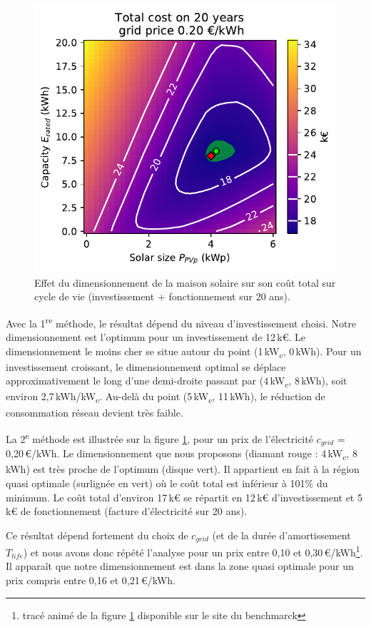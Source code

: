\documentclass[a4paper,10pt,twocolumn]{article}
\newcommand\tsp[1]{\textsuperscript{#1}}
\newcommand\sub[1]{\textsubscript{#1}}
\newcommand\kWc{kW\sub{c}{}} %
\begin{document}
\begin{figure}[!ht]
  \begin{center}
	  \includegraphics[width=0.8\columnwidth]{figures/Total_cost_map_grid020.pdf}
  \end{center}

  \caption{Effet du dimensionnement de la maison solaire sur son coût total sur cycle de vie
  (investissement + fonctionnement sur 20 ans).
  }
  \label{fig:cost_tot}
\end{figure}

Avec la 1\tsp{re} méthode, le résultat dépend du niveau d'investissement choisi.
Notre dimensionnement est l'optimum pour un investissement de 12\,k€.
Le dimensionnement le moins cher se situe autour du point
(1\,\kWc, 0\,kWh). Pour un investissement croissant,
le dimensionnement optimal se déplace approximativement le long
d'une demi-droite passant par (4\,\kWc, 8\,kWh), soit environ
2,7\,kWh/\kWc.
Au-delà du point (5\,\kWc, 11\,kWh), le réduction de consommation réseau devient très faible.

La 2\tsp{e} méthode est illustrée sur la figure \ref{fig:cost_tot},
pour un prix de l'électricité $c_{grid}$ = 0,20\,€/kWh.
Le dimensionnement que nous proposons (diamant rouge : 4\,kW\sub{c}, 8\,kWh)
est très proche de l'optimum (disque vert).
Il appartient en fait à la région quasi optimale (surlignée en vert)
où le coût total est inférieur à 101\% du minimum.
Le coût total d'environ 17\,k€ se répartit en 12\,k€ d'investissement
et 5\,k€ de fonctionnement (facture d'électricité sur 20 ans).

Ce résultat dépend fortement du choix de $c_{grid}$
(et de la durée d'amortissement $T_{life}$)
et nous avons donc répété l'analyse pour un prix entre 0,10 et 0,30\,€/kWh\footnote{%
  tracé animé de la figure \ref{fig:cost_tot} disponible sur le site du benchmarck}.
Il apparaît que notre dimensionnement est dans la zone quasi optimale pour un prix
compris entre 0,16 et 0,21\,€/kWh.
\end{document}
